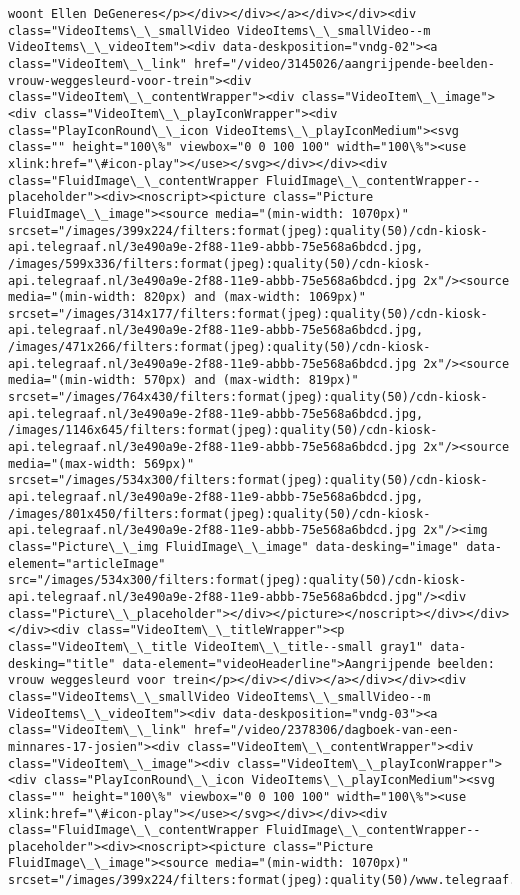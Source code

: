 \documentclass[11pt]{article}
\begin{document}
\begin{Verbatim}[commandchars=\\\{\}]
woont Ellen DeGeneres</p></div></div></a></div></div><div class="VideoItems\_\_smallVideo VideoItems\_\_smallVideo--m VideoItems\_\_videoItem"><div data-deskposition="vndg-02"><a class="VideoItem\_\_link" href="/video/3145026/aangrijpende-beelden-vrouw-weggesleurd-voor-trein"><div class="VideoItem\_\_contentWrapper"><div class="VideoItem\_\_image"><div class="VideoItem\_\_playIconWrapper"><div class="PlayIconRound\_\_icon VideoItems\_\_playIconMedium"><svg class="" height="100\%" viewbox="0 0 100 100" width="100\%"><use xlink:href="\#icon-play"></use></svg></div></div><div class="FluidImage\_\_contentWrapper FluidImage\_\_contentWrapper--placeholder"><div><noscript><picture class="Picture FluidImage\_\_image"><source media="(min-width: 1070px)" srcset="/images/399x224/filters:format(jpeg):quality(50)/cdn-kiosk-api.telegraaf.nl/3e490a9e-2f88-11e9-abbb-75e568a6bdcd.jpg, /images/599x336/filters:format(jpeg):quality(50)/cdn-kiosk-api.telegraaf.nl/3e490a9e-2f88-11e9-abbb-75e568a6bdcd.jpg 2x"/><source media="(min-width: 820px) and (max-width: 1069px)" srcset="/images/314x177/filters:format(jpeg):quality(50)/cdn-kiosk-api.telegraaf.nl/3e490a9e-2f88-11e9-abbb-75e568a6bdcd.jpg, /images/471x266/filters:format(jpeg):quality(50)/cdn-kiosk-api.telegraaf.nl/3e490a9e-2f88-11e9-abbb-75e568a6bdcd.jpg 2x"/><source media="(min-width: 570px) and (max-width: 819px)" srcset="/images/764x430/filters:format(jpeg):quality(50)/cdn-kiosk-api.telegraaf.nl/3e490a9e-2f88-11e9-abbb-75e568a6bdcd.jpg, /images/1146x645/filters:format(jpeg):quality(50)/cdn-kiosk-api.telegraaf.nl/3e490a9e-2f88-11e9-abbb-75e568a6bdcd.jpg 2x"/><source media="(max-width: 569px)" srcset="/images/534x300/filters:format(jpeg):quality(50)/cdn-kiosk-api.telegraaf.nl/3e490a9e-2f88-11e9-abbb-75e568a6bdcd.jpg, /images/801x450/filters:format(jpeg):quality(50)/cdn-kiosk-api.telegraaf.nl/3e490a9e-2f88-11e9-abbb-75e568a6bdcd.jpg 2x"/><img class="Picture\_\_img FluidImage\_\_image" data-desking="image" data-element="articleImage" src="/images/534x300/filters:format(jpeg):quality(50)/cdn-kiosk-api.telegraaf.nl/3e490a9e-2f88-11e9-abbb-75e568a6bdcd.jpg"/><div class="Picture\_\_placeholder"></div></picture></noscript></div></div></div><div class="VideoItem\_\_titleWrapper"><p class="VideoItem\_\_title VideoItem\_\_title--small gray1" data-desking="title" data-element="videoHeaderline">Aangrijpende beelden: vrouw weggesleurd voor trein</p></div></div></a></div></div><div class="VideoItems\_\_smallVideo VideoItems\_\_smallVideo--m VideoItems\_\_videoItem"><div data-deskposition="vndg-03"><a class="VideoItem\_\_link" href="/video/2378306/dagboek-van-een-minnares-17-josien"><div class="VideoItem\_\_contentWrapper"><div class="VideoItem\_\_image"><div class="VideoItem\_\_playIconWrapper"><div class="PlayIconRound\_\_icon VideoItems\_\_playIconMedium"><svg class="" height="100\%" viewbox="0 0 100 100" width="100\%"><use xlink:href="\#icon-play"></use></svg></div></div><div class="FluidImage\_\_contentWrapper FluidImage\_\_contentWrapper--placeholder"><div><noscript><picture class="Picture FluidImage\_\_image"><source media="(min-width: 1070px)" srcset="/images/399x224/filters:format(jpeg):quality(50)/www.telegraaf.nl/cdn/a607581c2a162c70bc9660d14dceb8bd.jpeg, 
\end{Verbatim}
\end{document}
